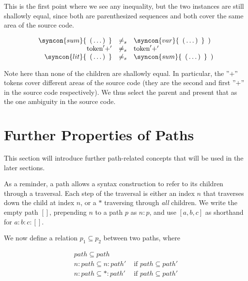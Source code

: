 \documentclass{kththesis}
\begin{document}
This is the first point where we see any inequality, but the two instances are still shallowly equal, since both are parenthesized sequences and both cover the same area of the source code.

$$
\begin{array}{rcl}
\syncon{sum}\{ \enspace \text{(} \ldots \text{)} \enspace \}
& \not=_s &
\syncon{var}\{ \enspace \text{(} \ldots \text{)} \enspace \} \enspace \text{)} \\

\text{token}'+' & \not=_s & \text{token}'+' \\

\syncon{lit}\{ \enspace \text{(} \ldots \text{)} \enspace \}
& \not=_s &
\syncon{sum}\{ \enspace \text{(} \ldots \text{)} \enspace \} \enspace \text{)} \\
\end{array}
$$

Note here than none of the children are shallowly equal. In particular, the ''$+$'' tokens cover different areas of the source code (they are the second and first ''$+$'' in the source code respectively). We thus select the parent and present that as the one ambiguity in the source code.

\section{Further Properties of Paths} \label{sec:paths}

This section will introduce further path-related concepts that will be used in the later sections.

As a reminder, a path allows a syntax construction to refer to its children through a traversal. Each step of the traversal is either an index $n$ that traverses down the child at index $n$, or a $*$ traversing through \emph{all} children. We write the empty path $[]$, prepending $n$ to a path $p$ as $n : p$, and use $[a, b, c]$ as shorthand for $a : b : c : []$.

We now define a relation $p_1 \subseteq p_2$ between two paths, where

$$
\begin{array}{ll}
path \subseteq path & \\
n : path \subseteq n : path' & \text{ if } path \subseteq path' \\
n : path \subseteq * : path' & \text{ if } path \subseteq path' \\
\end{array}
$$
\end{document}
